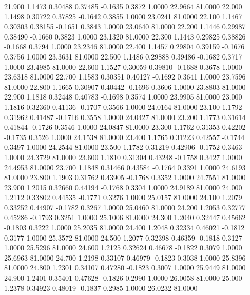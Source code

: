   21.900   1.1473   0.30488   0.37485  -0.1635   0.3872   1.0000  22.9664  81.0000
  22.000   1.1498   0.30722   0.37825  -0.1642   0.3855   1.0000  23.0241  81.0000
  22.100   1.1467   0.30303   0.38155  -0.1651   0.3843   1.0000  23.0640  81.0000
  22.200   1.1446   0.29987   0.38490  -0.1660   0.3823   1.0000  23.1320  81.0000
  22.300   1.1443   0.29825   0.38826  -0.1668   0.3794   1.0000  23.2346  81.0000
  22.400   1.1457   0.29804   0.39159  -0.1676   0.3756   1.0000  23.3631  81.0000
  22.500   1.1486   0.29888   0.39486  -0.1682   0.3717   1.0000  23.4985  81.0000
  22.600   1.1527   0.30059   0.39810  -0.1688   0.3678   1.0000  23.6318  81.0000
  22.700   1.1583   0.30351   0.40127  -0.1692   0.3641   1.0000  23.7596  81.0000
  22.800   1.1665   0.30907   0.40442  -0.1696   0.3606   1.0000  23.8803  81.0000
  22.900   1.1818   0.32448   0.40783  -0.1698   0.3574   1.0000  23.9905  81.0000
  23.000   1.1816   0.32360   0.41136  -0.1707   0.3566   1.0000  24.0164  81.0000
  23.100   1.1792   0.31962   0.41487  -0.1716   0.3558   1.0000  24.0427  81.0000
  23.200   1.1773   0.31614   0.41844  -0.1726   0.3546   1.0000  24.0847  81.0000
  23.300   1.1762   0.31353   0.42202  -0.1735   0.3526   1.0000  24.1538  81.0000
  23.400   1.1765   0.31223   0.42557  -0.1744   0.3497   1.0000  24.2544  81.0000
  23.500   1.1782   0.31219   0.42906  -0.1752   0.3463   1.0000  24.3729  81.0000
  23.600   1.1810   0.31304   0.43248  -0.1758   0.3427   1.0000  24.4953  81.0000
  23.700   1.1848   0.31466   0.43584  -0.1764   0.3391   1.0000  24.6193  81.0000
  23.800   1.1903   0.31762   0.43905  -0.1768   0.3352   1.0000  24.7551  81.0000
  23.900   1.2015   0.32660   0.44194  -0.1768   0.3304   1.0000  24.9189  81.0000
  24.000   1.2112   0.33802   0.44535  -0.1771   0.3276   1.0000  25.0157  81.0000
  24.100   1.2079   0.33252   0.44907  -0.1782   0.3267   1.0000  25.0460  81.0000
  24.200   1.2053   0.32777   0.45286  -0.1793   0.3251   1.0000  25.1006  81.0000
  24.300   1.2040   0.32447   0.45662  -0.1803   0.3222   1.0000  25.2035  81.0000
  24.400   1.2048   0.32334   0.46021  -0.1812   0.3177   1.0000  25.3572  81.0000
  24.500   1.2077   0.32398   0.46359  -0.1818   0.3127   1.0000  25.5296  81.0000
  24.600   1.2125   0.32624   0.46678  -0.1822   0.3079   1.0000  25.6963  81.0000
  24.700   1.2198   0.33107   0.46979  -0.1823   0.3038   1.0000  25.8396  81.0000
  24.800   1.2301   0.34107   0.47280  -0.1823   0.3007   1.0000  25.9449  81.0000
  24.900   1.2401   0.35401   0.47628  -0.1826   0.2990   1.0000  26.0058  81.0000
  25.000   1.2378   0.34923   0.48019  -0.1837   0.2985   1.0000  26.0232  81.0000
